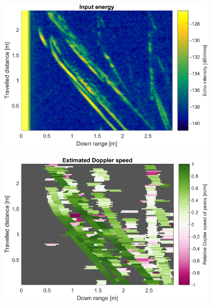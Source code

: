 \begin{figure}[htbp]
    \centering
    \begin{subfigure}[t]{0.475\linewidth}
        \centering
        \includegraphics[width=\linewidth,max height=.475\textheight]{gfx/results/garden_input.png}
    \end{subfigure}%
    \hfill%
    \begin{subfigure}[t]{0.475\linewidth}  
        \centering 
        \includegraphics[width=\linewidth,max height=.475\textheight]{gfx/results/garden_doppler.png}
    \end{subfigure}\bigskip\\
    \begin{subfigure}[t]{0.5\linewidth}   
        \centering 

\end{subfigure}
\end{figure}
